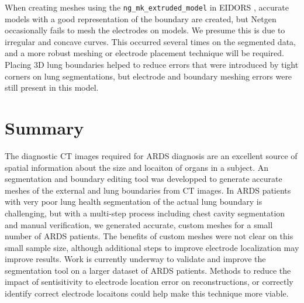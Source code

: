 When creating meshes using the \verb!ng_mk_extruded_model! in EIDORS \parencite{grychtol_fem_2013}, 
accurate models with a good representation of the boundary are created, but 
Netgen occasionally fails to mesh the electrodes on models. We presume this is 
due to irregular and concave curves.
This occurred several times on the segmented data, and a more robust meshing
or electrode placement technique will be required. Placing 3D lung boundaries helped to reduce 
errors that were introduced by tight corners on lung segmentations, but electrode and boundary meshing
errors were still present in this model. 

\section{Summary}

The diagnostic CT images required for ARDS diagnosis are an excellent source of spatial 
information about the size and locaiton of organs in a subject. 
An segmentation and boundary 
editing tool
was developped to generate accurate meshes of the external and lung
boundaries from CT images. 
In ARDS patients with very poor lung health segmentation of the actual lung boundary is 
challenging, but with a multi-step process including chest cavity segmentation and 
manual verification, we generated accurate, custom meshes for 
a small number of ARDS patients. The benefits of custom meshes were not clear on this small
sample size, although additional steps to improve electrode localization may
improve results. Work is currently underway to validate and improve the segmentation tool on 
a larger dataset of ARDS patients. 
Methods to reduce the impact of sentisitivity to electrode 
location error on reconstructions, or correctly identify 
correct electrode locaitons could help make this technique more viable. 

